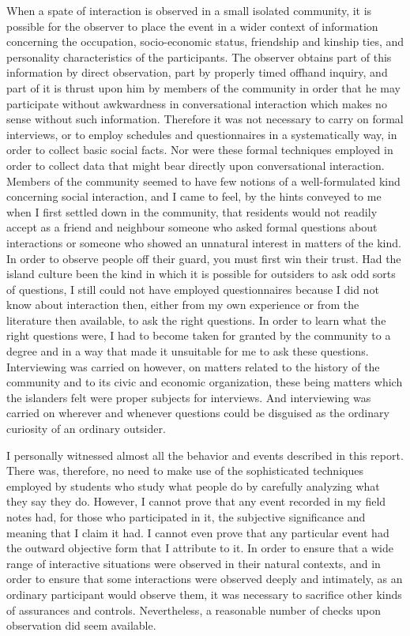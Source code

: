 \documentclass[openany,nobib]{tufte-book}
\begin{document}
When a spate of interaction is observed in a small isolated community,
it is possible for the observer to place the event in a wider context of
information concerning the occupation, socio-economic status, friendship
and kinship ties, and personality characteristics of the participants.
The observer obtains part of this information by direct observation,
part by properly timed offhand inquiry, and part of it is thrust upon
him by members of the community in order that he may participate without
awkwardness in conversational interaction which makes no sense without
such information. Therefore it was not necessary to carry on formal
interviews, or to employ schedules and questionnaires in a
systematically way, in order to collect basic social facts. Nor were
these formal techniques employed in order to collect data that might
bear directly upon conversational interaction. Members of the community
seemed to have few notions of a well-formulated kind concerning social
interaction, and I came to feel, by the hints conveyed to me when I
first settled down in the community, that residents would not readily
accept as a friend and neighbour someone who asked formal questions
about interactions or someone who showed an unnatural interest in
matters of the kind. In order to observe people off their guard, you
must first win their trust. Had the island culture been the kind in
which it is possible for outsiders to ask odd sorts of questions, I
still could not have employed questionnaires because I did not know
about interaction then, either from my own experience or from the
literature then available, to ask the right questions. In order to learn
what the right questions were, I had to become taken for granted by the
community to a degree and in a way that made it unsuitable for me to ask
these questions. Interviewing was carried on however, on matters related
to the history of the community and to its civic and economic
organization, these being matters which the islanders felt were proper
subjects for interviews. And interviewing was carried on wherever and
whenever questions could be disguised as the ordinary curiosity of an
ordinary outsider.

I personally witnessed almost all the behavior and events described in
this report. There was, therefore, no need to make use of the
sophisticated techniques employed by students who study what people do
by carefully analyzing what they say they do. However, I cannot prove
that any event recorded in my field notes had, for those who
participated in it, the subjective significance and meaning that I claim
it had. I cannot even prove that any particular event had the outward
objective form that I attribute to it. In order to ensure that a wide
range of interactive situations were observed in their natural contexts,
and in order to ensure that some interactions were observed deeply and
intimately, as an ordinary participant would observe them, it was
necessary to sacrifice other kinds of assurances and controls.
Nevertheless, a reasonable number of checks upon observation did seem
available.
\end{document}
